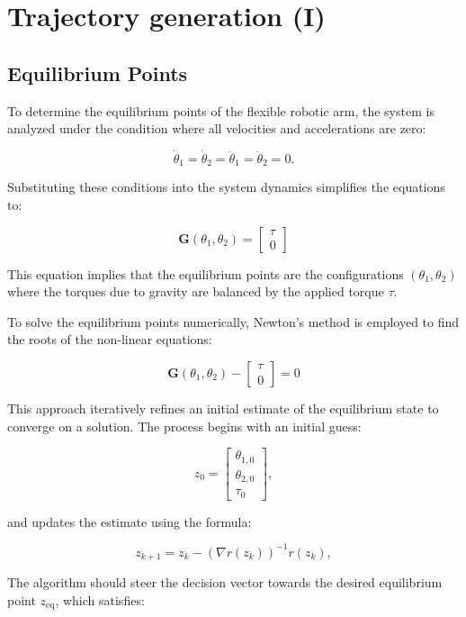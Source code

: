 \chapter{Trajectory generation (I)}
\section{Equilibrium Points}
To determine the equilibrium points of the flexible robotic arm, the system is analyzed under the condition where all velocities and accelerations are zero:

\[
\dot{\theta}_1 = \dot{\theta}_2 = \ddot{\theta}_1 = \ddot{\theta}_2 = 0.
\]

Substituting these conditions into the system dynamics simplifies the equations to:

\[
\mathbf{G}(\theta_1, \theta_2) = 
\begin{bmatrix} 
\tau \\ 
0 
\end{bmatrix}
\]

This equation implies that the equilibrium points are the configurations \((\theta_1, \theta_2)\) where the torques due to gravity are balanced by the applied torque \(\tau\).

To solve the equilibrium points numerically, Newton's method is employed to find the roots of the non-linear equations:

\[
\mathbf{G}(\theta_1, \theta_2) - \begin{bmatrix} 
\tau \\ 
0 
\end{bmatrix} = 0
\]

This approach iteratively refines an initial estimate of the equilibrium state to converge on a solution. The process begins with an initial guess:

\[
z_0 = \begin{bmatrix} \theta_{1,0} \\ \theta_{2,0} \\ \tau_0 \end{bmatrix},
\]

and updates the estimate using the formula:

\[
z_{k+1} = z_k - \left(\nabla r(z_k)\right)^{-1} r(z_k),
\label{eq:z_uptadte} 
\]

The algorithm should steer the decision vector towards the desired equilibrium point \( z_{\text{eq}} \), which satisfies:

